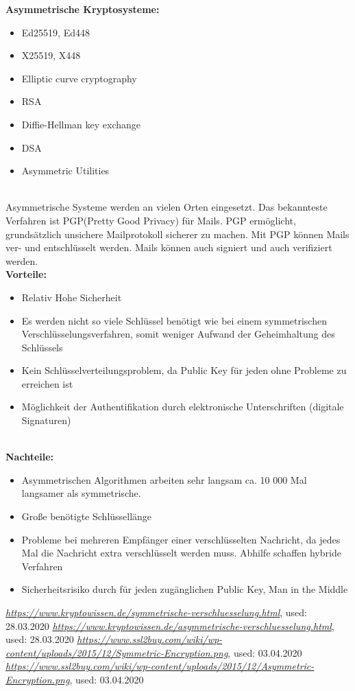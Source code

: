 \documentclass{article}
\begin{document}
\textbf{Asymmetrische Kryptosysteme:}
\begin{itemize}
    \item Ed25519, Ed448
    \item X25519, X448
    \item Elliptic curve cryptography
    \item RSA
    \item Diffie-Hellman key exchange
    \item DSA
    \item Asymmetric Utilities
\end{itemize}
\cite{2} \\

Asymmetrische Systeme werden an vielen Orten eingesetzt. Das bekannteste Verfahren ist PGP(Pretty Good Privacy) für Mails. PGP ermöglicht, grundsätzlich unsichere Mailprotokoll sicherer zu machen. Mit PGP können Mails ver- und entschlüsselt werden. Mails können auch signiert und auch verifiziert werden.\\

\textbf{Vorteile:}
\begin{itemize}
    \item Relativ Hohe Sicherheit
    \item Es werden nicht so viele Schlüssel benötigt wie bei einem symmetrischen Verschlüsselungsverfahren, somit weniger Aufwand der Geheimhaltung des Schlüssels
    \item Kein Schlüsselverteilungsproblem, da Public Key für jeden ohne Probleme zu erreichen ist
    \item Möglichkeit der Authentifikation durch elektronische Unterschriften (digitale Signaturen)
\end{itemize}
\cite{2} \\

\textbf{Nachteile:}
\begin{itemize}
    \item Asymmetrischen Algorithmen arbeiten sehr langsam ca. 10 000 Mal langsamer als symmetrische.
    \item Große benötigte Schlüssellänge
    \item Probleme bei mehreren Empfänger einer verschlüsselten Nachricht, da jedes Mal die Nachricht extra verschlüsselt werden muss. Abhilfe schaffen hybride Verfahren
    \item Sicherheitsrisiko durch für jeden zugänglichen Public Key, Man in the Middle
\end{itemize}
\cite{2}

\begin{thebibliography}{9}
     \emph{\url{https://www.kryptowissen.de/symmetrische-verschluesselung.html}}, used: 28.03.2020
     \emph{\url{https://www.kryptowissen.de/asymmetrische-verschluesselung.html}}, used: 28.03.2020
     \emph{\url{https://www.ssl2buy.com/wiki/wp-content/uploads/2015/12/Symmetric-Encryption.png}}, used: 03.04.2020
     \emph{\url{https://www.ssl2buy.com/wiki/wp-content/uploads/2015/12/Asymmetric-Encryption.png}}, used: 03.04.2020
\end{thebibliography}
\end{document}
